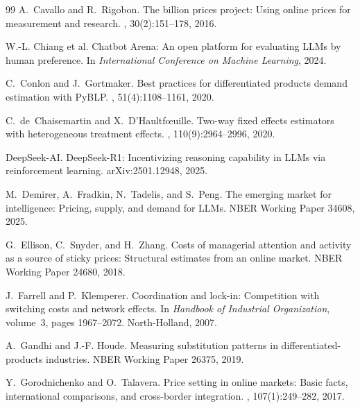 \documentclass{article}
\begin{document}
\begin{thebibliography}{99}
A.~Cavallo and R.~Rigobon.
\newblock The billion prices project: Using online prices for measurement and research.
, 30(2):151--178, 2016.

W.-L. Chiang et al.
\newblock Chatbot Arena: An open platform for evaluating LLMs by human preference.
\newblock In {\em International Conference on Machine Learning}, 2024.

C.~Conlon and J.~Gortmaker.
\newblock Best practices for differentiated products demand estimation with PyBLP.
, 51(4):1108--1161, 2020.

C.~de~Chaisemartin and X.~D'Haultf\oe uille.
\newblock Two-way fixed effects estimators with heterogeneous treatment effects.
, 110(9):2964--2996, 2020.

DeepSeek-AI.
\newblock DeepSeek-R1: Incentivizing reasoning capability in LLMs via reinforcement
  learning.
\newblock arXiv:2501.12948, 2025.

M.~Demirer, A.~Fradkin, N.~Tadelis, and S.~Peng.
\newblock The emerging market for intelligence: Pricing, supply, and demand for LLMs.
\newblock NBER Working Paper 34608, 2025.

G.~Ellison, C.~Snyder, and H.~Zhang.
\newblock Costs of managerial attention and activity as a source of sticky prices:
  Structural estimates from an online market.
\newblock NBER Working Paper 24680, 2018.

J.~Farrell and P.~Klemperer.
\newblock Coordination and lock-in: Competition with switching costs and network effects.
\newblock In {\em Handbook of Industrial Organization}, volume~3, pages 1967--2072.
  North-Holland, 2007.

A.~Gandhi and J.-F. Houde.
\newblock Measuring substitution patterns in differentiated-products industries.
\newblock NBER Working Paper 26375, 2019.

Y.~Gorodnichenko and O.~Talavera.
\newblock Price setting in online markets: Basic facts, international comparisons, and
  cross-border integration.
, 107(1):249--282, 2017.


\end{thebibliography}
\end{document}
